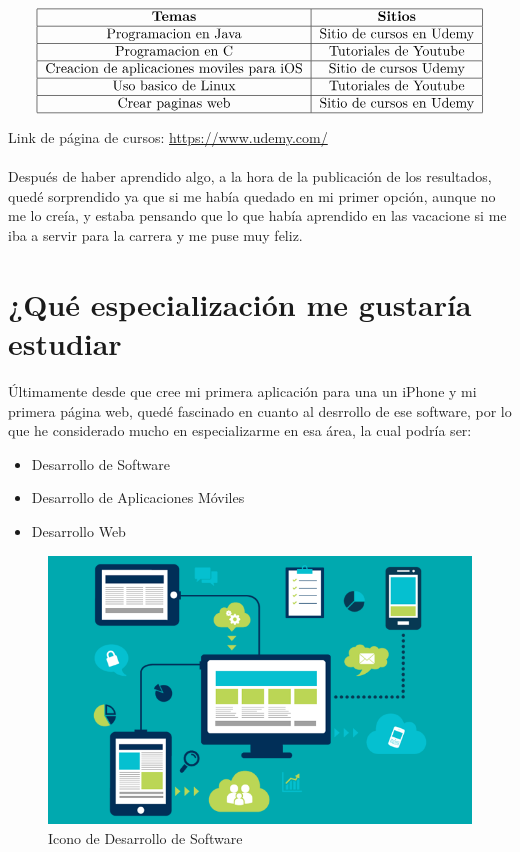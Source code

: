 \documentclass[12pt, letterpaper]{article}
\begin{document}
\[
\begin{tabular}{|c|c|}
  \hline
  \textbf{Temas} & \textbf{Sitios}\\
  \hline
  Programacion en Java & Sitio de cursos en Udemy\\
  \hline
  Programacion en C & Tutoriales de Youtube\\
  \hline
  Creacion de aplicaciones moviles para iOS & Sitio de cursos Udemy\\
  \hline
  Uso basico de Linux & Tutoriales de Youtube\\
  \hline
  Crear paginas web & Sitio de cursos en Udemy\\
  \hline
\end{tabular}
\]

Link de página de cursos: \url{https://www.udemy.com/}
\\
\\
Después de haber aprendido algo, a la hora de la publicación de los resultados, quedé sorprendido ya que si me había quedado en mi primer opción, aunque no me lo creía, y estaba pensando que lo que había aprendido en las vacacione si me iba a servir para la carrera y me puse muy feliz.
\newpage
    
\section{¿Qué especialización me gustaría estudiar}
Últimamente desde que cree mi primera aplicación para una un iPhone y mi primera página web, quedé fascinado en cuanto al desrrollo de ese software, por lo que he considerado mucho en especializarme en esa área, la cual podría ser:
\begin{itemize}
\item Desarrollo de Software
\item Desarrollo de Aplicaciones Móviles
\item Desarrollo Web
\end{itemize}
\begin{figure}[h]
  \centering
  \includegraphics[scale=.25]{imagenDesarrolloAppWeb}
  \caption{Icono de Desarrollo de Software}
  \label{fig:icono}
\end{figure}
\end{document}
